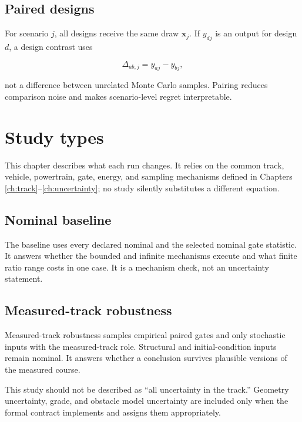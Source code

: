\documentclass[11pt,oneside]{report}
\begin{document}
\section{Paired designs}

For scenario $j$, all designs receive the same draw $\mathbf{x}_j$.  If $y_{dj}$ is an
output for design $d$, a design contrast uses

\begin{equation}
\Delta_{ab,j}=y_{aj}-y_{bj},
\end{equation}

not a difference between unrelated Monte Carlo samples.  Pairing reduces comparison
noise and makes scenario-level regret interpretable.

\chapter{Study types}\label{ch:studies}

This chapter describes what each run changes.  It relies on the common track, vehicle,
powertrain, gate, energy, and sampling mechanisms defined in Chapters
\ref{ch:track}--\ref{ch:uncertainty}; no study silently substitutes a different equation.

\section{Nominal baseline}

The baseline uses every declared nominal and the selected nominal gate statistic.  It
answers whether the bounded and infinite mechanisms execute and what finite ratio range
costs in one case.  It is a mechanism check, not an uncertainty statement.

\section{Measured-track robustness}

Measured-track robustness samples empirical paired gates and only stochastic inputs with
the measured-track role.  Structural and initial-condition inputs remain nominal.  It
answers whether a conclusion survives plausible versions of the measured course.

This study should not be described as ``all uncertainty in the track.''  Geometry
uncertainty, grade, and obstacle model uncertainty are included only when the formal
contract implements and assigns them appropriately.
\end{document}
